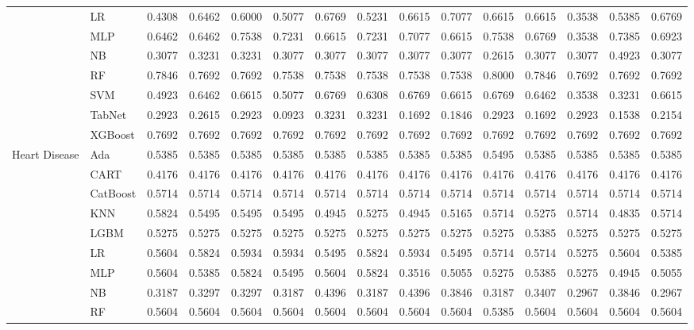 \begin{table*}[ht]
{\begin{tabular}{llrrrrrrrrrrrrr}
 & LR & 0.4308 & 0.6462 & 0.6000 & 0.5077 & 0.6769 & 0.5231 & 0.6615 & 0.7077 & 0.6615 & 0.6615 & 0.3538 & 0.5385 & 0.6769 \\
 & MLP & 0.6462 & 0.6462 & 0.7538 & 0.7231 & 0.6615 & 0.7231 & 0.7077 & 0.6615 & 0.7538 & 0.6769 & 0.3538 & 0.7385 & 0.6923 \\
 & NB & 0.3077 & 0.3231 & 0.3231 & 0.3077 & 0.3077 & 0.3077 & 0.3077 & 0.3077 & 0.2615 & 0.3077 & 0.3077 & 0.4923 & 0.3077 \\
 & RF & 0.7846 & 0.7692 & 0.7692 & 0.7538 & 0.7538 & 0.7538 & 0.7538 & 0.7538 & 0.8000 & 0.7846 & 0.7692 & 0.7692 & 0.7692 \\
 & SVM & 0.4923 & 0.6462 & 0.6615 & 0.5077 & 0.6769 & 0.6308 & 0.6769 & 0.6615 & 0.6769 & 0.6462 & 0.3538 & 0.3231 & 0.6615 \\
 & TabNet & 0.2923 & 0.2615 & 0.2923 & 0.0923 & 0.3231 & 0.3231 & 0.1692 & 0.1846 & 0.2923 & 0.1692 & 0.2923 & 0.1538 & 0.2154 \\
 & XGBoost & 0.7692 & 0.7692 & 0.7692 & 0.7692 & 0.7692 & 0.7692 & 0.7692 & 0.7692 & 0.7692 & 0.7692 & 0.7692 & 0.7692 & 0.7692 \\
\cline{1-15}
\multirow[t]{12}{*}{Heart Disease} & Ada & 0.5385 & 0.5385 & 0.5385 & 0.5385 & 0.5385 & 0.5385 & 0.5385 & 0.5385 & 0.5495 & 0.5385 & 0.5385 & 0.5385 & 0.5385 \\
 & CART & 0.4176 & 0.4176 & 0.4176 & 0.4176 & 0.4176 & 0.4176 & 0.4176 & 0.4176 & 0.4176 & 0.4176 & 0.4176 & 0.4176 & 0.4176 \\
 & CatBoost & 0.5714 & 0.5714 & 0.5714 & 0.5714 & 0.5714 & 0.5714 & 0.5714 & 0.5714 & 0.5714 & 0.5714 & 0.5714 & 0.5714 & 0.5714 \\
 & KNN & 0.5824 & 0.5495 & 0.5495 & 0.5495 & 0.4945 & 0.5275 & 0.4945 & 0.5165 & 0.5714 & 0.5275 & 0.5714 & 0.4835 & 0.5714 \\
 & LGBM & 0.5275 & 0.5275 & 0.5275 & 0.5275 & 0.5275 & 0.5275 & 0.5275 & 0.5275 & 0.5275 & 0.5385 & 0.5275 & 0.5275 & 0.5275 \\
 & LR & 0.5604 & 0.5824 & 0.5934 & 0.5934 & 0.5495 & 0.5824 & 0.5934 & 0.5495 & 0.5714 & 0.5714 & 0.5275 & 0.5604 & 0.5385 \\
 & MLP & 0.5604 & 0.5385 & 0.5824 & 0.5495 & 0.5604 & 0.5824 & 0.3516 & 0.5055 & 0.5275 & 0.5385 & 0.5275 & 0.4945 & 0.5055 \\
 & NB & 0.3187 & 0.3297 & 0.3297 & 0.3187 & 0.4396 & 0.3187 & 0.4396 & 0.3846 & 0.3187 & 0.3407 & 0.2967 & 0.3846 & 0.2967 \\
 & RF & 0.5604 & 0.5604 & 0.5604 & 0.5604 & 0.5604 & 0.5604 & 0.5604 & 0.5604 & 0.5385 & 0.5604 & 0.5604 & 0.5604 & 0.5604 \\

\end{tabular}}
\end{table*}
